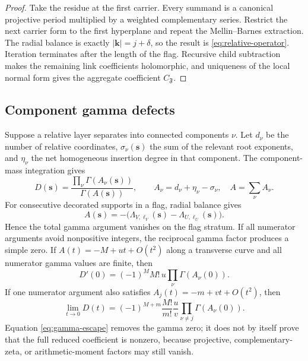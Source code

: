 \documentclass[11pt]{article}
\begin{document}
\begin{proof}
Take the residue at the first carrier.  Every summand is a canonical
projective period multiplied by a weighted complementary series.
Restrict the next carrier form to the first hyperplane and repeat the
Mellin--Barnes extraction.  The radial balance is exactly
\(|\mathbf k|=j+\delta\), so the result is
\eqref{eq:relative-operator}.  Iteration terminates after the length of
the flag.  Recursive child subtraction makes the remaining link
coefficients holomorphic, and uniqueness of the local normal form gives
the aggregate coefficient \(C_{\mathfrak F}\).
\end{proof}

\subsection{Component gamma defects}

Suppose a relative layer separates into connected components \(\nu\).
Let \(d_\nu\) be the number of relative coordinates,
\(\sigma_\nu(\mathbf s)\) the sum of the relevant root exponents, and
\(\eta_\nu\) the net homogeneous insertion degree in that component.
The component-mass integration gives
\begin{equation}\label{eq:component-gamma}
 D(\mathbf s)=
 \frac{\prod_\nu\Gamma(A_\nu(\mathbf s))}
      {\Gamma(A(\mathbf s))},
 \qquad
 A_\nu=d_\nu+\eta_\nu-\sigma_\nu,
 \quad A=\sum_\nu A_\nu.
\end{equation}
For consecutive decorated supports in a flag, radial balance gives
\begin{equation}\label{eq:flag-balance}
 A(\mathbf s)=
 -\bigl(\Lambda_{V,\ell_V}(\mathbf s)
        -\Lambda_{U,\ell_U}(\mathbf s)\bigr).
\end{equation}
Hence the total gamma argument vanishes on the flag stratum.  If all
numerator arguments avoid nonpositive integers, the reciprocal gamma
factor produces a simple zero.  If
\(A(t)=-M+ut+O(t^2)\) along a transverse curve and all numerator gamma
values are finite, then
\begin{equation}\label{eq:gamma-derivative}
 D'(0)=(-1)^M M!\,u\prod_\nu\Gamma(A_\nu(0)).
\end{equation}
If one numerator argument also satisfies
\(A_j(t)=-m+vt+O(t^2)\), then
\begin{equation}\label{eq:gamma-escape}
 \lim_{t\to0}D(t)=
 (-1)^{M+m}\frac{M!}{m!}\frac{u}{v}
 \prod_{\nu\ne j}\Gamma(A_\nu(0)).
\end{equation}
Equation \eqref{eq:gamma-escape} removes the gamma zero; it does not by
itself prove that the full reduced coefficient is nonzero, because
projective, complementary-zeta, or arithmetic-moment factors may still
vanish.
\end{document}
